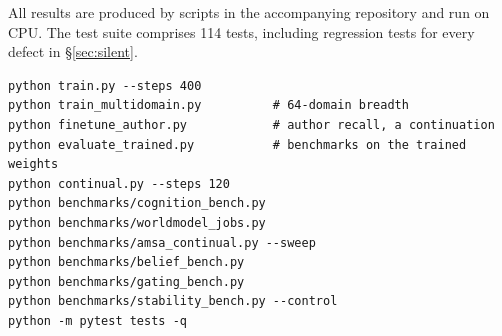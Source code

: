 \documentclass[10pt,twocolumn]{article}
\begin{document}
All results are produced by scripts in the accompanying repository and run on
CPU. The test suite comprises 114 tests, including regression tests for every
defect in \S\ref{sec:silent}.

\begin{lstlisting}
python train.py --steps 400
python train_multidomain.py          # 64-domain breadth
python finetune_author.py            # author recall, a continuation
python evaluate_trained.py           # benchmarks on the trained weights
python continual.py --steps 120
python benchmarks/cognition_bench.py
python benchmarks/worldmodel_jobs.py
python benchmarks/amsa_continual.py --sweep
python benchmarks/belief_bench.py
python benchmarks/gating_bench.py
python benchmarks/stability_bench.py --control
python -m pytest tests -q
\end{lstlisting}
\end{document}
